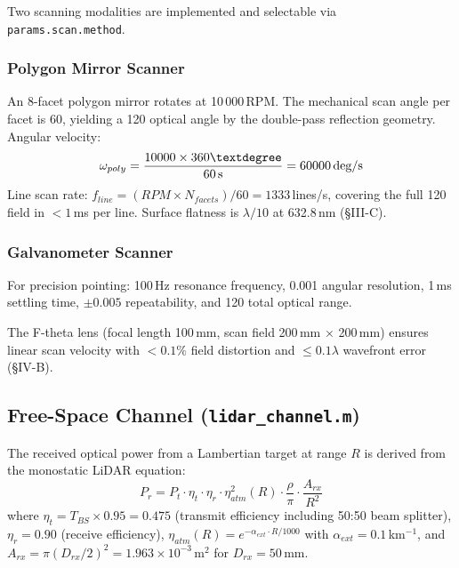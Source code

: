 \documentclass[12pt,a4paper]{article}
\begin{document}
Two scanning modalities are implemented and selectable via
\texttt{params.scan.method}.

\subsubsection{Polygon Mirror Scanner}
An 8-facet polygon mirror rotates at 10\,000\,RPM.  The mechanical scan angle per
facet is 60\textdegree{}, yielding a 120\textdegree{} optical angle by the double-pass
reflection geometry.  Angular velocity:
\begin{equation}
    \omega_{poly} = \frac{10000 \times 360\textdegree}{60\,\mathrm{s}}
    = 60000\,\text{deg/s}
\end{equation}
Line scan rate: $f_{line} = (RPM \times N_{facets})/60 = 1333$\,lines/s, covering the
full 120\textdegree{} field in $<1$\,ms per line.  Surface flatness is $\lambda/10$ at
632.8\,nm (\S III-C).

\subsubsection{Galvanometer Scanner}
For precision pointing: 100\,Hz resonance frequency, 0.001\textdegree{} angular
resolution, 1\,ms settling time, $\pm0.005$\textdegree{} repeatability, and 120\textdegree{}
total optical range.

The F-theta lens (focal length 100\,mm, scan field 200\,mm $\times$ 200\,mm) ensures
linear scan velocity with $<0.1\%$ field distortion and $\leq0.1\lambda$ wavefront
error (\S IV-B).

\subsection{Free-Space Channel (\texttt{lidar\_channel.m})}

The received optical power from a Lambertian target at range $R$ is derived from the
monostatic LiDAR equation:
\begin{equation}
    P_r = P_t \cdot \eta_t \cdot \eta_r \cdot \eta_{atm}^2(R)
    \cdot \frac{\rho}{\pi} \cdot \frac{A_{rx}}{R^2}
    \label{eq:lidar}
\end{equation}
where $\eta_t = T_{BS}\times0.95 = 0.475$ (transmit efficiency including 50:50 beam
splitter), $\eta_r = 0.90$ (receive efficiency), $\eta_{atm}(R) =
e^{-\alpha_{ext}\cdot R/1000}$ with $\alpha_{ext} = 0.1$\,km$^{-1}$, and
$A_{rx} = \pi(D_{rx}/2)^2 = 1.963\times10^{-3}$\,m$^2$ for $D_{rx} = 50$\,mm.
\end{document}
